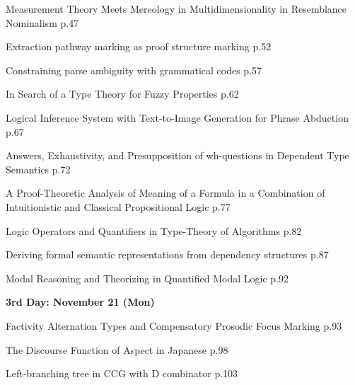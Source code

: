 \documentclass[12pt]{jarticle}
\begin{document}
  
     {Measurement Theory Meets Mereology in Multidimensionality in Resemblance Nominalism}
     {p.47}
  
     {Extraction pathway marking as proof structure marking}
     {p.52}
  
     {Constraining parse ambiguity with grammatical codes}
     {p.57}




  
     {In Search of a Type Theory for Fuzzy Properties}
     {p.62}
  
     {Logical Inference System with Text-to-Image Generation for Phrase Abduction}
     {p.67}
  
     {Answers, Exhaustivity, and Presupposition of wh-questions in Dependent Type Semantics}
     {p.72}




  
     {A Proof-Theoretic Analysis of Meaning of a Formula in a Combination of Intuitionistic and Classical Propositional Logic}
     {p.77}
  
     {Logic Operators and Quantifiers in Type-Theory of Algorithms}
     {p.82}
  
     {Deriving formal semantic representations from dependency structures}
     {p.87}




  
     {Modal Reasoning and Theorizing in Quantified Modal Logic}
     {p.92}




\noindent\textbf{\large 
3rd Day: November 21 (Mon)
}\\




  
     {Factivity Alternation Types and Compensatory Prosodic Focus Marking}
     {p.93}
  
     {The Discourse Function of Aspect in Japanese}
     {p.98}
  
     {Left-branching tree in CCG with D combinator}
     {p.103}
\end{document}
